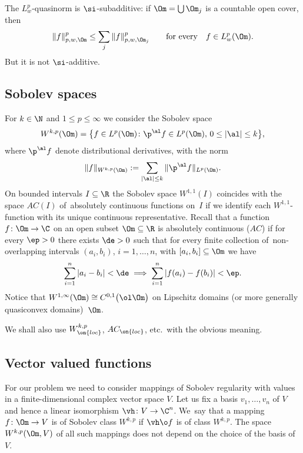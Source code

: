 The $L^p_w$-quasinorm is $\si$-subadditive: if
$\Om = \bigcup \Om_j$ is a countable open cover, then
\begin{gather*}
 \|f\|^p_{p,w,\Om} \le \sum_j \|f\|^p_{p,w,\Om_j} \qquad \text{for every}\quad f \in L^p_w(\Om).
\end{gather*}
But it is not $\si$-additive.

\subsection{Sobolev spaces}
For $k \in \N$ and $1 \le p \le \infty$ we consider the Sobolev space
\begin{gather*}
 W^{k,p}(\Om) = \big\{f \in L^p(\Om) \colon \p^\al f \in L^p(\Om), \, 0 \le |\al| \le k\big\},
\end{gather*}
where $\p^\al f$ denote distributional derivatives, with the norm
\begin{gather*}
 \|f\|_{W^{k,p}(\Om)} := \sum_{|\al| \le k} \|\p^\al f\|_{L^p(\Om)}.
\end{gather*}
On bounded intervals $I \subseteq \R$ the Sobolev space $W^{1,1}(I)$
coincides with the space $AC(I)$ of~abso\-lutely continuous functions on~$I$
if we identify each $W^{1,1}$-function with its unique continuous representative.
Recall that a function $f \colon \Om \to \C$ on an open subset $\Om \subseteq \R$
is absolutely continuous ($AC$) if for every $\ep>0$ there exists $\de>0$ such that
for every finite collection of~non-overlapping intervals $(a_i,b_i)$, $i =1,\dots,n$, with
$[a_i,b_i] \subseteq \Om$ we have
\begin{gather*}
 \sum_{i=1}^n |a_i -b_i| < \de \implies \sum_{i=1}^n |f(a_i) -f(b_i)| < \ep.
\end{gather*}
Notice that $W^{1,\infty}(\Om) \cong C^{0,1}\big(\ol \Om\big)$ on Lipschitz domains (or more generally quasiconvex domains)~$\Om$.

We shall also use $W^{k,p}_{\on{loc}}$, $AC_{\on{loc}}$, etc.\ with the obvious meaning.

\subsection{Vector valued functions}

For our problem we need to consider mappings of Sobolev regularity with values in a finite-dimensional complex vector space $V$.
Let us fix a basis $v_1, \dots, v_n$ of $V$ and hence a linear isomorphism $\vh \colon V \to \C^n$. We~say that a mapping $f \colon \Om \to V$ is of Sobolev class $W^{k,p}$ if $\vh \o f$ is of class $W^{k,p}$.
The space $W^{k,p}(\Om, V)$ of all such mappings does not depend on the choice of the basis of $V$.

